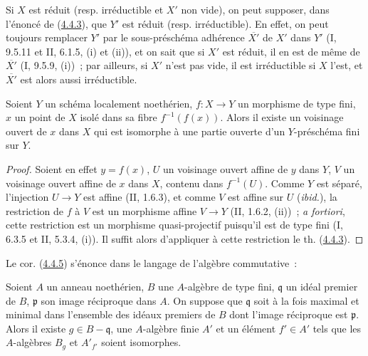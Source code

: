 \begin{remark}[4.4.4]
\label{III.4.4.4-fr}
Si $X$ est réduit (resp. irréductible et $X'$ non vide), on peut supposer,
dans l'énoncé de (\hyperref[III.4.4.3-fr]{4.4.3}), que $Y'$ est réduit (resp.
irréductible). En effet, on peut toujours remplacer $Y'$ par le
sous-préschéma adhérence $\overline{X'}$ de $X'$ dans $Y'$ (I, 9.5.11 et
II, 6.1.5, (i) et (ii)), et on sait que si $X'$ est réduit, il en est de même
de $\overline{X'}$ (I, 9.5.9, (i))~; par ailleurs, si $X'$ n'est pas vide, il
est irréductible si $X$ l'est, et $\overline{X'}$ est alors aussi
irréductible.
\end{remark}

\begin{corollary}[4.4.5]
\label{III.4.4.5-fr}
Soient $Y$ un schéma localement noethérien, $f:X\to Y$ un morphisme de type
fini, $x$ un point de $X$ isolé dans sa fibre $f^{-1}(f(x))$. Alors il existe
un voisinage ouvert de $x$ dans $X$ qui est isomorphe à une partie ouverte
d'un $Y$-préschéma fini sur $Y$.
\end{corollary}

\begin{proof}
Soient en effet $y=f(x)$, $U$ un voisinage ouvert affine de $y$ dans $Y$,
$V$ un voisinage ouvert affine de $x$ dans $X$, contenu dans $f^{-1}(U)$.
Comme $Y$ est séparé, l'injection $U\to Y$ est affine (II, 1.6.3), et comme
$V$ est affine sur $U$ (\emph{ibid.}), la restriction de $f$ à $V$ est un
morphisme affine $V\to Y$ (II, 1.6.2, (ii))~; \emph{a fortiori}, cette
restriction est un morphisme quasi-projectif puisqu'il est de type fini
(I, 6.3.5 et II, 5.3.4, (i)). Il suffit alors d'appliquer à cette restriction
le th. (\hyperref[III.4.4.3-fr]{4.4.3}).
\end{proof}

Le cor. (\hyperref[III.4.4.5-fr]{4.4.5}) s'énonce dans le langage de
l'algèbre commutative~:


\begin{corollary}[4.4.6]
\label{III.4.4.6-fr}
Soient $A$ un anneau noethérien, $B$ une $A$-algèbre de type fini,
$\mathfrak q$ un idéal premier de $B$, $\mathfrak p$ son image réciproque
dans $A$. On suppose que $\mathfrak q$ soit à la fois maximal et minimal dans
l'ensemble des idéaux premiers de $B$ dont l'image réciproque est
$\mathfrak p$. Alors il existe $g\in B-\mathfrak q$, une $A$-algèbre finie
$A'$ et un élément $f'\in A'$ tels que les $A$-algèbres $B_g$ et $A'_{f'}$
soient isomorphes.
\end{corollary}

